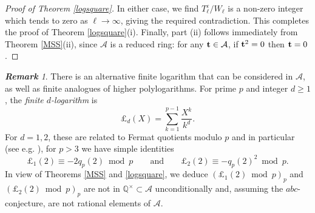 \documentclass[12pt,reqno]{amsart}
\theoremstyle{remark}
\newtheorem{remark}[theorem]{\bf Remark}
\newcommand{\cA}{\mathcal A}
\newcommand{\LL}{\pounds}
\begin{document}
\begin{proof}[Proof of Theorem \ref{logsquare}]
In either case, we find $T_\ell^\varepsilon/W_\ell$ is a non-zero integer which tends to zero as $\ell\to\infty$, giving the required contradiction. 
This completes the proof of Theorem \ref{logsquare}(i). 
Finally, part (ii) follows immediately from Theorem \ref{MSS}(ii), since $\cA$ is a reduced ring: for any ${\bf t}\in\cA$, if ${\bf t}^2=0$ then ${\bf t}=0$.
\end{proof}


\begin{remark}
There is an alternative finite logarithm that can be considered in $\cA$, as well as finite analogues of higher polylogarithms. 
For prime $p$ and integer $d\geq 1$, the {\it finite $d$-logarithm} is
\[\LL_{d}(X)=\sum_{k=1}^{p-1}\frac{X^k}{k^d}.\]
For $d=1,2$, these are related to Fermat quotients modulo $p$ and in particular (see e.g. \cite{Gr04}), for $p>3$ we have simple identities
\[\LL_{1}(2)\equiv -2q_p(2)\bmod p\qquad\text{and}\qquad\LL_{2}(2)\equiv -q_p(2)^2\bmod p.\]
In view of Theorems \ref{MSS} and \ref{logsquare}, we deduce $\left(\LL_{1}(2)\bmod p\right)_p$ and $\left(\LL_{2}(2)\bmod p\right)_p$ are not in $\mathbb{Q}^\times\subset\cA$ unconditionally and, assuming the $abc$-conjecture, are not rational elements of $\cA$.
\end{remark}
\end{document}

